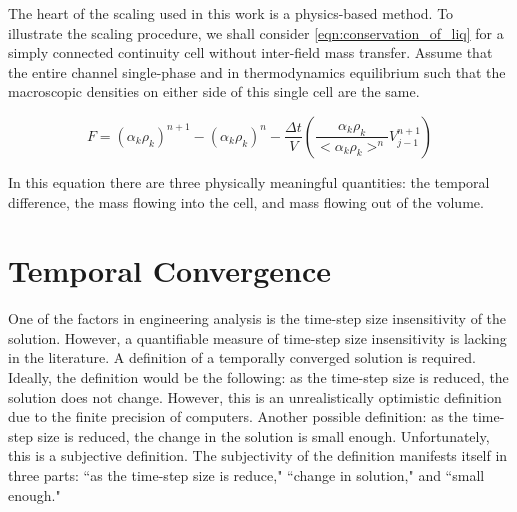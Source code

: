 The heart of the scaling used in this work is a physics-based method.
To illustrate the scaling procedure, we shall consider \eqref{eqn:conservation_of_liq} for a simply connected continuity cell without inter-field mass transfer.
Assume that the entire channel single-phase and in thermodynamics equilibrium such that the macroscopic densities on either side of this single cell are the same.

\begin{equation}
F = \left(\alpha_k \rho_k\right)^{n+1} - \left( \alpha_k \rho_k \right)^n - \frac{\Delta t}{V} \left( \frac{\alpha_k \rho_k }{<\alpha_k \rho_k>^n} V^{n+1}_{j-1} \right)
\end{equation}

In this equation there are three physically meaningful quantities: the temporal difference, the mass flowing into the cell, and mass flowing out of the volume. 


\section{Temporal Convergence}
\label{sect:temporal_convergence}

One of the factors in engineering analysis is the time-step size insensitivity of the solution.
However, a quantifiable measure of time-step size insensitivity is lacking in the literature.
A definition of a temporally converged solution is required.
Ideally, the definition would be the following: as the time-step size is reduced, the solution does not change.
However, this is an unrealistically optimistic definition due to the finite precision of computers.
Another possible definition: as the time-step size is reduced, the change in the solution is small enough.
Unfortunately, this is a subjective definition.
The subjectivity of the definition manifests itself in three parts: ``as the time-step size is reduce," ``change in solution," and ``small enough."

